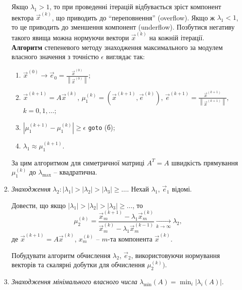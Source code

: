 \begin{enumerate}
	Якщо $\lambda_1 > 1$, то при проведенні ітерацій відбувається зріст компонент вектора $\vec x^{(k)}$, що приводить до ``переповнення'' (overflow). Якщо ж $\lambda_1 < 1$, то це приводить до зменшення компонент (underflow). Позбутися негативу такого явища можна нормуючи вектори $\vec x^{(k)}$ на кожній ітерації. \\

	\textbf{Алгоритм} степеневого методу знаходження максимального за модулем власного значення з точністю $\epsilon$ виглядає так:
	\begin{enumerate}
		\item $\vec x^{(0)} \to \vec e_0 = \frac{\vec x^{(0)}}{\left\|\vec x^{(0)}\right\|}$;

		\item $\vec x^{(k+1)} = A \vec x^{(k)}$, $\mu_1^{(k)} = \left(\vec x^{(k+1)}, \vec e^{(k)}\right)$, $\vec e^{(k+1)} = \frac{\vec x^{(k+1)}}{\left\|\vec x^{(k+1)}\right\|}$, $k = 0,1,\ldots$;

		\item $|\mu_1^{(k+1)} - \mu_1^{(k)}| \ge \epsilon$ \verb|goto| (б);

		\item $\lambda_1 \approx \mu_1^{(k+1)}$.
	\end{enumerate}

	За цим алгоритмом для симетричної матриці $A^T = A$ швидкість прямування $\mu_1^{(k)}$ до $\lambda_{\max}$ -- квадратична.

	\item \textit{Знаходження} $\lambda_2: |\lambda_1| > |\lambda_2| > |\lambda_3| \ge \ldots$. Нехай $\lambda_1$, $\vec e_1$ відомі.

	\begin{problem}
		Довести, що якщо $|\lambda_1| > |\lambda_2| > |\lambda_3| \ge \ldots$, то
		\[ \mu_2^{(k)} = \dfrac{\vec x_m^{(k+1)} - \lambda_1 \vec x_m^{(k)}}{\vec x_m^{(k)} - \lambda_1 \vec x_m^{(k-1)}} \xrightarrow[k\to\infty]{} \lambda_2,\]
		де $\vec x^{(k+1)} = A \vec x^{(k)}$, $x_m^{(k)}$ -- $m$-та компонента $\vec x^{(k)}$.
	\end{problem}

	\begin{problem}
		Побудувати алгоритм обчислення $\lambda_2$, $\vec e_2$, використовуючи нормування векторів та скалярні добутки для обчислення $\mu_2^{(k)})$.
	\end{problem}	

	\item \textit{Знаходження мінімального власного числа} $\lambda_{\min}(A) = \min_i |\lambda_i(A)|$.


\end{enumerate}
